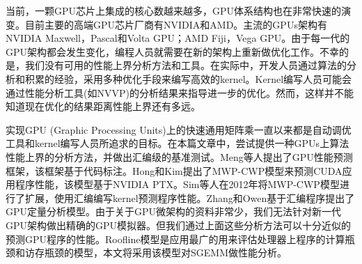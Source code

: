 %
%
当前，一颗GPU芯片上集成的核心数越来越多，GPU体系结构也在非常快速的演变。目前主要的高端GPU芯片厂商有NVIDIA和AMD。主流的GPUs架构有NVIDIA Maxwell，Pascal和Volta GPU；AMD Fiji，Vega GPU。由于每一代的GPU架构都会发生变化，编程人员就需要在新的架构上重新做优化工作。不幸的是，我们没有可用的性能上界分析方法和工具。在实际中，开发人员通过算法的分析和积累的经验，采用多种优化手段来编写高效的kernel。Kernel编写人员可能会通过性能分析工具(如NVVP)的分析结果来指导进一步的优化。然而，这样并不能知道现在优化的结果距离性能上界还有多远。

实现GPU (Graphic Processing Units)上的快速通用矩阵乘一直以来都是自动调优工具和kernel编写人员所追求的目标。在本篇文章中，尝试提供一种GPUs上算法性能上界的分析方法，并做出汇编级的基准测试。Meng等人提出了GPU性能预测框架，该框架基于代码标注。Hong和Kim提出了MWP-CWP模型来预测CUDA应用程序性能，该模型基于NVIDIA PTX。Sim等人在2012年将MWP-CWP模型进行了扩展，使用汇编编写kernel预测程序性能。Zhang和Owen基于汇编程序提出了GPU定量分析模型。由于关于GPU微架构的资料非常少，我们无法针对新一代GPU架构做出精确的GPU模拟器。但我们通过上面这些分析方法可以十分近似的预测GPU程序的性能。Roofline模型是应用最广的用来评估处理器上程序的计算瓶颈和访存瓶颈的模型，本文将采用该模型对SGEMM做性能分析。


